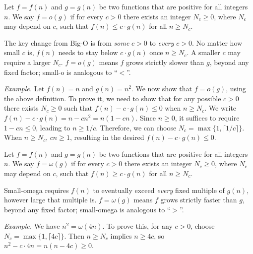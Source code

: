 \begin{definition}[small-o]
Let $f = f(n)$ and $g=g(n)$ be two functions that are positive for all integers $n$.
We say $f = o(g)$ if for every $c > 0$ there exists an integer $N_c \ge 0$, where $N_c$ may depend on $c$,
such that $f(n) \le c\cdot g(n)$ for all $n\ge N_c$.
\end{definition}

The key change from Big-O is from \emph{some} $c>0$ to
\emph{every} $c>0$. No matter how small $c$ is, 
$f(n)$ needs to stay below $c\cdot g(n)$ once $n \ge N_c$.
A smaller $c$ may require a larger $N_c$.
$f=o(g)$ means $f$ grows strictly slower than $g$, beyond any fixed factor;
small-o is analogous to ``$<$''.


\emph{Example.} Let $f(n) = n$ and $g(n) = n^2$. We now show that $f = o(g)$,
using the above definition.
To prove it, we need to show that for any possible $c>0$ there exists $N_c \ge 0$ such that $f(n) -c\cdot g(n) \le 0$ when $n \ge N_c$.
We write $f(n) - c\cdot g(n) = n - cn^2 = n(1-cn)$. Since $n\ge 0$, it suffices to require $1-cn \le 0$, leading to $n \ge 1/c$.
Therefore, we can choose $N_c = \max\{1, \lceil 1/c \rceil\}$.
When $n \ge N_c$, $cn \ge 1$, resulting in the desired $f(n) - c\cdot g(n) \le 0$.


\begin{definition}
Let $f = f(n)$ and $g=g(n)$ be two functions that are positive for all integers $n$.
We say $f = \omega(g)$ if for every $c > 0$ there exists an integer $N_c \ge 0$, where $N_c$ may depend on $c$,
such that $f(n) \ge c\cdot g(n)$ for all $n\ge N_c$.
\end{definition}

Small-omega requires $f(n)$ to eventually exceed \emph{every} fixed
multiple of $g(n)$, however large that multiple is.
$f = \omega(g)$ means $f$ grows strictly faster than $g$, beyond any fixed factor;
small-omega is analogous to ``$>$''.

\emph{Example.} We have $n^2=\omega(4n)$. To prove this, for any $c>0$, choose
$N_c=\max\{1,\lceil 4c\rceil\}$. Then $n\ge N_c$ implies $n\ge 4c$, so
$n^2 - c\cdot 4n = n(n-4c)\ge 0$.

